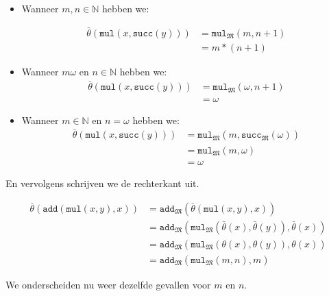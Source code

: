\documentclass[a4paper,11pt]{article}
\begin{document}
\begin{itemize}
\begin{itemize}
\item
Wanneer $m,n \in \mathbb{N}$ hebben we:

\begin{align*}
\bar \theta(\texttt{mul}(x,\texttt{succ}(y))) &= \texttt{mul}_{\mathfrak{M}}(m, n+1) \\
                                              &= m*(n+1)
\end{align*}

\item
Wanneer $m \omega$ en $n \in \mathbb{N}$ hebben we:
\begin{align*}
\bar \theta(\texttt{mul}(x,\texttt{succ}(y))) &= \texttt{mul}_{\mathfrak{M}}(\omega, n+1) \\
                                              &= \omega
\end{align*}

\item
Wanneer $m \in \mathbb{N}$ en $n = \omega$ hebben we:
\begin{align*}
\bar \theta(\texttt{mul}(x,\texttt{succ}(y))) &= \texttt{mul}_{\mathfrak{M}}(m, \texttt{succ}_{\mathfrak{M}}(\omega)) \\
                                              &= \texttt{mul}_{\mathfrak{M}}(m, \omega) \\
                                              &= \omega
\end{align*}

\end{itemize}

En vervolgens schrijven we de rechterkant uit.

\begin{align*}
\bar \theta(\texttt{add}(\texttt{mul}(x,y),x)) &= \texttt{add}_{\mathfrak{M}}(\bar \theta(\texttt{mul}(x,y),x)) \\
                                               &= \texttt{add}_{\mathfrak{M}}(\texttt{mul}_{\mathfrak{M}}(\bar \theta(x),\bar \theta(y)),\bar \theta(x)) \\
                                               &= \texttt{add}_{\mathfrak{M}}(\texttt{mul}_{\mathfrak{M}}(\theta(x),\theta(y)),\theta(x)) \\
                                               &= \texttt{add}_{\mathfrak{M}}(\texttt{mul}_{\mathfrak{M}}(m,n),m)
\end{align*}

We onderscheiden nu weer dezelfde gevallen voor $m$ en $n$.

\begin{itemize}


\end{itemize}
\end{itemize}
\end{document}
